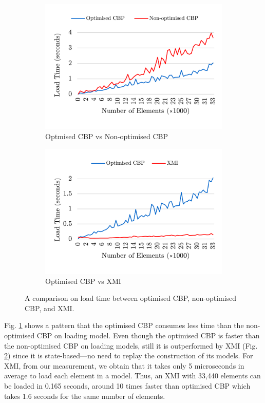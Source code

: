 \documentclass{llncs}
\begin{document}
\begin{figure}[ht]	
    \begin{subfigure}[t]{0.5\linewidth}
		\includegraphics[width=\linewidth]{loading_speed_conf}
		\caption{Optmised CBP vs Non-optimised CBP}\label{fig:loading_speed_conf}
	\end{subfigure}
	\hfill
	\begin{subfigure}[t]{0.5\linewidth}
		\includegraphics[width=\linewidth]{loading_speed_conf_ocbp_xmi}
		\caption{Optimised CBP vs XMI}\label{fig:loading_speed_conf_ocbp_xmi}		
	\end{subfigure}	
	\caption{A comparison on load time between optimised CBP, non-optimised CBP, and XMI.}
	\label{fig:loading_speed}
\end{figure}

Fig. \ref{fig:loading_speed_conf} shows a pattern that the optimised CBP consumes less time than the non-optimised CBP on loading model. Even though the optimised CBP is faster than the non-optimised CBP on loading models, still it is outperformed by XMI (Fig. \ref{fig:loading_speed_conf_ocbp_xmi}) since it is state-based---no need to replay the construction of its models. For XMI, from our measurement, we obtain that it takes only 5 microseconds in average to load each element in a model. Thus, an XMI with 33,440 elements can be loaded in 0.165 seconds, around 10 times faster than optimised CBP which takes 1.6 seconds for the same number of elements. 
\end{document}
